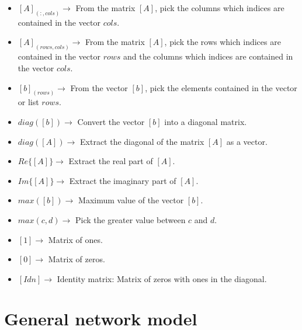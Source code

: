 \documentclass[nols,a4paper,twoside,symmetric,notoc,fleqn]{tufte-book}
\begin{document}
\begin{fullwidth}
\begin{multicols}{2}
\begin{itemize}
	
	\item $[A]_{(:, cols)} \rightarrow$ From the matrix $[A]$, pick the columns which indices are contained in the vector  $cols$.
	
	
	\item $[A]_{(rows, cols)} \rightarrow$ From the matrix $[A]$, pick the rows which indices are contained in the vector  $rows$ and the columns which indices are contained in the vector  $cols$.
	
	
	\item $[b]_{(rows)} \rightarrow$ From the vector $[b]$, pick the elements contained in the vector or list $rows$.
	
	\item $diag([b]) \rightarrow$ Convert the vector $[b]$ into a diagonal matrix. 
	
	\item $diag([A]) \rightarrow$ Extract the diagonal of the matrix $[A]$ as a vector. 
	
	\item $Re\{ [A] \} \rightarrow$ Extract the real part of $[A]$.
	
	\item $Im \{ [A] \} \rightarrow$ Extract the imaginary part of $[A]$.
	
	\item $max([b]) \rightarrow$ Maximum value of the vector $[b]$.
	
	\item $max(c, d) \rightarrow$ Pick the greater value between $c$ and $d$.
	
	\item $[1]  \rightarrow$ Matrix of ones.

	\item $[0]  \rightarrow$ Matrix of zeros.
	
	\item $[Idn]  \rightarrow$ Identity matrix: Matrix of zeros with ones in the diagonal.
\end{itemize}

\end{multicols}

\end{fullwidth}

\chapter{General network model}
\end{document}
